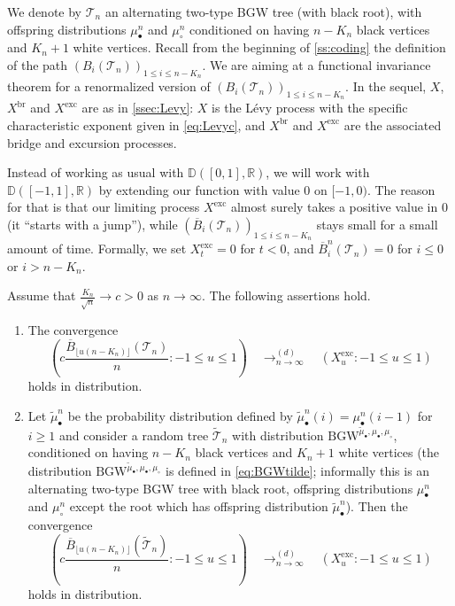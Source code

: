 \documentclass[AHL,XML,longabstracts,Unicode]{cedram}
\newcommand{\R}{\mathbb{R}}
\newcommand{\D}{\mathbb{D}}
\def\tmub{\widetilde{\mu}_{\bullet}}
\def\mub{\mu_{\bullet}}
\def\muc{\mu_{\circ}}
\def\mubn{\mu_{\bullet}^{n}}
\def\mucn{\mu_{\circ}^{n}}
\def\oB{\overline{B}}
\def \Xexc{X^{\mathrm{exc}}}
\def \Xbr{X^{\mathrm{br}}}
\newcommand\BGW{\textrm{BGW}}
\def\Ts{\mathscr{T}}
\begin{document}
\enlargethispage*{1em}%
We denote by $ \Ts_{n}$ an alternating two-type BGW tree (with black root), with offspring distributions $\mubn$ and $\mucn$ conditioned on having $n-K_{n}$ black vertices and $K_{n}+1$ white vertices.  Recall from the beginning of \cref{ss:coding} the definition of the path $(B_{i}(\Ts_{n}))_{1 \leq i \leq n-K_{n}}$.
We are aiming at a functional invariance theorem for a renormalized version of $(B_{i}(\Ts_{n}))_{1 \leq i \leq n-K_{n}}$.
In the sequel, $X$, $\Xbr$ and $\Xexc$ are as in \cref{ssec:Levy}:
$X$ is the L\'evy process with the specific characteristic exponent given in \eqref{eq:Levyc},
and $\Xbr$ and $\Xexc$ are the associated bridge and excursion processes.

Instead of working as usual with $\D([0,1],\R)$, we will work with $\D([-1,1],\R)$
by extending our function with value $0$ on $[-1,0)$.
The reason for that is that our limiting process $\Xexc$ almost surely
takes a positive value in $0$ (it ``starts with a jump''),
while $(\oB_{i}(\Ts_{n}))_{1 \leq i \leq n-K_{n}}$ stays small for a small amount of time.
Formally, we set $\Xexc_{t}=0$ for $t<0$,
and $\overline{B}^{n}_{i}(\Ts_n)=0$ for $i \leq 0$ or $i>n-K_{n}$.


\begin{theorem}\label{thm:cvXexc} Assume that $ \tfrac{K_{n}}{\sqrt{n}} \rightarrow c>0$ as $n \rightarrow \infty$. The following assertions hold.
\begin{enumerate}
\item[(i)] The convergence \[  \left(  c \frac{\oB_{\lfloor u (n-K_{n}) \rfloor}(\Ts_{n})}{ n} : -1 \leq u \leq 1\right)  \quad \mathop{\longrightarrow}^{(d)}_{n \rightarrow \infty} \quad (\Xexc_{u}: -1 \leq u \leq 1)\]
holds in distribution.
\item[(ii)]
  Let $\widetilde{\mu}^{n}_{\bullet}$ be the probability distribution defined by
  $\widetilde{\mu}^{n}_{\bullet}(i)=\mubn(i-1)$ for $i \geq 1$
  and consider a random tree $\tilde{\Ts}_{n}$ with distribution ${\BGW}^{\tmub,\mub,\muc}$,
  conditioned on having $n-K_{n}$ black vertices and $K_{n}+1$ white vertices
  (the distribution ${\BGW}^{\tmub,\mub,\muc}$ is defined in \eqref{eq:BGWtilde}; informally this is an alternating two-type BGW tree with black root, offspring distributions $\mubn$ and $\mucn$ except the root which has offspring distribution $\widetilde{\mu}^{n}_{\bullet}$).
  Then the convergence
  \[  \left(  c \frac{\oB_{\lfloor u (n-K_{n}) \rfloor}(\tilde{\Ts}_{n})}{ n} : -1 \leq u \leq 1\right)  \quad \mathop{\longrightarrow}^{(d)}_{n \rightarrow \infty} \quad (\Xexc_{u}: -1 \leq u \leq 1)\]
holds in distribution.
\end{enumerate}
\end{theorem}
\end{document}
